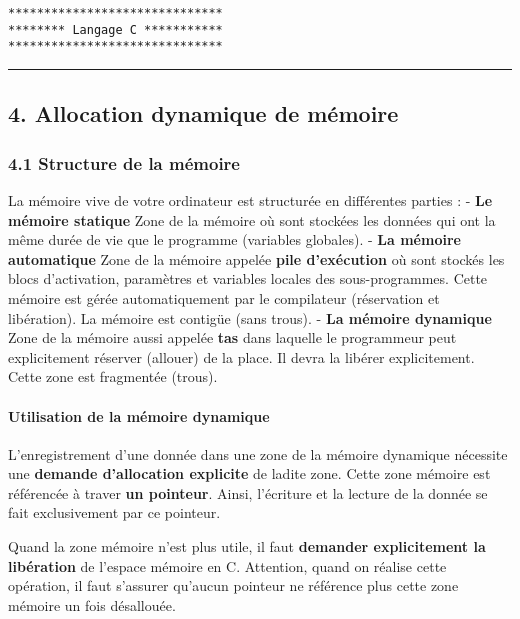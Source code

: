 \documentclass[11pt]{article}
\begin{document}
    \begin{Verbatim}[commandchars=\\\{\}]
******************************
******** Langage C ***********
******************************

    \end{Verbatim}

    \begin{center}\rule{0.5\linewidth}{\linethickness}\end{center}

    \subsection{4. Allocation dynamique de
mémoire}\label{allocation-dynamique-de-muxe9moire}

    \subsubsection{4.1 Structure de la
mémoire}\label{structure-de-la-muxe9moire}

La mémoire vive de votre ordinateur est structurée en différentes
parties : - \textbf{Le mémoire statique} Zone de la mémoire où sont
stockées les données qui ont la même durée de vie que le programme
(variables globales). - \textbf{La mémoire automatique} Zone de la
mémoire appelée \textbf{pile d'exécution} où sont stockés les blocs
d'activation, paramètres et variables locales des sous-programmes. Cette
mémoire est gérée automatiquement par le compilateur (réservation et
libération). La mémoire est contigüe (sans trous). - \textbf{La mémoire
dynamique} Zone de la mémoire aussi appelée \textbf{tas} dans laquelle
le programmeur peut explicitement réserver (allouer) de la place. Il
devra la libérer explicitement. Cette zone est fragmentée (trous).

    \paragraph{Utilisation de la mémoire
dynamique}\label{utilisation-de-la-muxe9moire-dynamique}

L'enregistrement d'une donnée dans une zone de la mémoire dynamique
nécessite une \textbf{demande d'allocation explicite} de ladite zone.
Cette zone mémoire est référencée à traver \textbf{un pointeur}. Ainsi,
l'écriture et la lecture de la donnée se fait exclusivement par ce
pointeur.

Quand la zone mémoire n'est plus utile, il faut \textbf{demander
explicitement la libération} de l'espace mémoire en C. Attention, quand
on réalise cette opération, il faut s'assurer qu'aucun pointeur ne
référence plus cette zone mémoire un fois désallouée.
\end{document}
